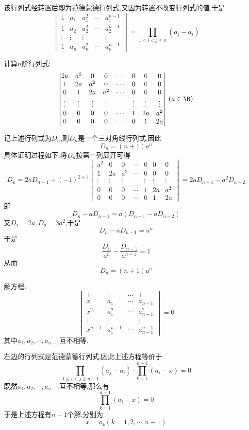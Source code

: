 \documentclass{ctexart}
\begin{document}
\begin{solution}
    该行列式经转置后即为范德蒙德行列式,又因为转置不改变行列式的值,于是
    \[\begin{vmatrix}
        1&a_1&a_1^2&\cdots&a_1^{n-1}\\
        1&a_2&a_2^2&\cdots&a_2^{n-1}\\
        \vdots&\vdots&\vdots& &\vdots\\
        1&a_n&a_n^2&\cdots&a_n^{n-1}
    \end{vmatrix}=\prod_{1\leqslant i<j\leqslant n}\left(a_j-a_i\right)\]
\end{solution}
\begin{homework}[6]
    计算$n$阶行列式:
    \[\begin{vmatrix}
        2a&a^2&0&0&\cdots&0&0&0\\
        1&2a&a^2&0&\cdots&0&0&0\\
        0&1&2a&a^2&\cdots&0&0&0\\
        \vdots&\vdots&\vdots&\vdots& &\vdots&\vdots&\vdots\\
        0&0&0&0&\cdots&1&2a&a^2\\
        0&0&0&0&\cdots&0&1&2a
    \end{vmatrix}\ (a\in\R)\]
\end{homework}
\begin{solution}
    记上述行列式为$D_n$,则$D_n$是一个三对角线行列式,因此
    \[D_n=(n+1)a^n\]
    具体证明过程如下:将$D_n$按第一列展开可得
    \[D_n=2aD_{n-1}+(-1)^{2+1}\begin{vmatrix}
        a^2&0&0&\cdots&0&0&0\\
        1&2a&a^2&\cdots&0&0&0\\
        \vdots&\vdots&\vdots& &\vdots&\vdots&\vdots\\
        0&0&0&\cdots&1&2a&a^2\\
        0&0&0&\cdots&0&1&2a
    \end{vmatrix}=2aD_{n-1}-a^2D_{n-2}\]
    即
    \[D_n-aD_{n-1}=a\left(D_{n-1}-aD_{n-2}\right)\]
    又$D_1=2a,D_2=3a^2$,于是
    \[D_n-aD_{n-1}=a^n\]
    于是
    \[\dfrac{D_n}{a^n}-\dfrac{D_{n-1}}{a^{n-1}}=1\]
    从而
    \[D_n=(n+1)a^n\]
\end{solution}
\begin{homework}[7]
    解方程:
    \[\begin{vmatrix}
        1&1&\cdots&1\\
        x&a_1&\cdots&a_{n-1}\\
        x^2&a_1^2&\cdots&a_{n-1}^2\\
        \vdots&\vdots& &\vdots\\
        x^{n-1}&a_1^{n-1}&\cdots&a_{n-1}^{n-1}
    \end{vmatrix}=0\]
    其中$a_1,a_2,\cdots,a_{n-1}$互不相等.
\end{homework}
\begin{solution}
    左边的行列式是范德蒙德行列式,因此上述方程等价于
    \[\prod_{1\leqslant i<j\leqslant n-1}\left(a_j-a_i\right)\cdot\prod_{k=1}^{n-1}\left(a_i-x\right)=0\]
    既然$a_1,a_2,\cdots,a_{n-1}$互不相等,那么有
    \[\prod_{k=1}^{n-1}\left(a_i-x\right)=0\]
    于是上述方程有$n-1$个解,分别为
    \[x=a_k(k=1,2,\cdots,n-1)\]
\end{solution}
\end{document}
